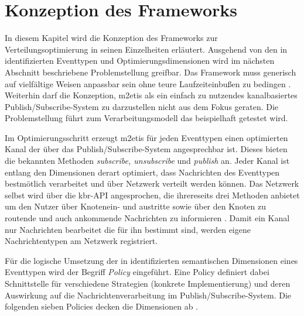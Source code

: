 \chapter{Konzeption des Frameworks}
\label{chap:konzeption_pubsub}
In diesem Kapitel wird die Konzeption des Frameworks zur Verteilungsoptimierung in seinen Einzelheiten erläutert. Ausgehend von den in \cite{Ficher2010a} identifizierten Eventtypen und Optimierungsdimensionen wird im nächsten Abschnitt beschriebene Problemstellung greifbar. Das Framework muss generisch auf vielfältige Weisen anpassbar sein ohne teure Laufzeiteinbußen zu bedingen \cite{NEW_PAPER} . Weiterhin darf die Konzeption, \ac{m2etis} als ein einfach zu nutzendes kanalbasiertes Publish/Subscribe-System zu darzustellen nicht aus dem Fokus geraten. Die Problemstellung führt zum Verarbeitungsmodell das beispielhaft getestet wird.

Im Optimierungsschritt erzeugt \ac{m2etis} für jeden Eventtypen einen optimierten Kanal der über das Publish/Subscribe-System angesprechbar ist. Dieses bieten die bekannten Methoden \emph{subscribe, unsubscribe} und \emph{publish} an. Jeder Kanal ist entlang den Dimensionen derart optimiert, dass Nachrichten des Eventtypen bestmötlich verarbeitet und über Netzwerk verteilt werden können. Das Netzwerk selbst wird über die \ac{kbr}-API angesprochen, die ihrereseits drei Methoden anbietet um den Nutzer über Knotenein- und austritte sowie über den Knoten zu routende und auch ankommende Nachrichten zu informieren \cite{Dabek2003Towards}. Damit ein Kanal nur Nachrichten bearbeitet die für ihn bestimmt sind, werden eigene Nachrichtentypen am Netzwerk registriert.

Für die logische Umsetzung der in \cite{Fischer2010Event} identifizierten semantischen Dimensionen eines Eventtypen wird der Begriff \emph{Policy} eingeführt. Eine Policy definiert dabei Schnittstelle für verschiedene Strategien (konkrete Implementierung) und deren Auswirkung auf die Nachrichtenverarbeitung im Publish/Subscribe-System. Die folgenden sieben Policies decken die Dimensionen ab \cite{NEW_PAPER}.

